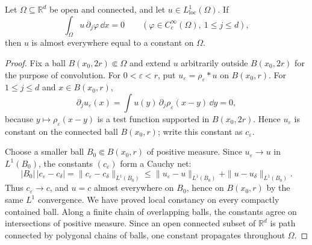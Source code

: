 \begin{notecorollary}
Let $\Omega\subseteq\mathbb R^d$ be open and connected, and let
$u\in L^1_{\mathrm{loc}}(\Omega)$.  If
\[
  \int_\Omega u\,\partial_j\varphi\,\dd x=0
  \qquad
  (\varphi\in C_c^\infty(\Omega),\ 1\le j\le d),
\]
then $u$ is almost everywhere equal to a constant on $\Omega$.
\end{notecorollary}

\begin{proof}
Fix a ball $B(x_0,2r)\Subset\Omega$ and extend $u$ arbitrarily outside
$B(x_0,2r)$ for the purpose of convolution.  For
$0<\varepsilon<r$, put $u_\varepsilon=\rho_\varepsilon*u$ on
$B(x_0,r)$.  For $1\le j\le d$ and $x\in B(x_0,r)$,
\[
  \partial_j u_\varepsilon(x)
  =\int u(y)\,\partial_j\rho_\varepsilon(x-y)\,\dd y=0,
\]
because $y\mapsto\rho_\varepsilon(x-y)$ is a test function supported in
$B(x_0,2r)$.  Hence $u_\varepsilon$ is constant on the connected ball
$B(x_0,r)$; write this constant as $c_\varepsilon$.

Choose a smaller ball $B_0\Subset B(x_0,r)$ of positive measure.  Since
$u_\varepsilon\to u$ in $L^1(B_0)$, the constants $(c_\varepsilon)$ form a
Cauchy net:
\[
  |B_0|\,|c_\varepsilon-c_\delta|
  =\|c_\varepsilon-c_\delta\|_{L^1(B_0)}
  \le\|u_\varepsilon-u\|_{L^1(B_0)}
     +\|u-u_\delta\|_{L^1(B_0)}.
\]
Thus $c_\varepsilon\to c$, and $u=c$ almost everywhere on $B_0$, hence on
$B(x_0,r)$ by the same $L^1$ convergence.  We have proved local constancy on
every compactly contained ball.  Along a finite chain of overlapping balls,
the constants agree on intersections of positive measure.  Since an open
connected subset of $\mathbb R^d$ is path connected by polygonal chains of
balls, one constant propagates throughout $\Omega$.
\end{proof}

